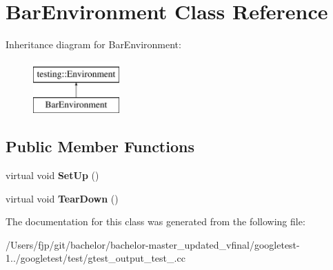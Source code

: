\hypertarget{class_bar_environment}{}\section{Bar\+Environment Class Reference}
\label{class_bar_environment}
Inheritance diagram for Bar\+Environment\+:\begin{figure}[H]
\begin{center}
\leavevmode
\includegraphics[height=2.000000cm]{class_bar_environment}
\end{center}
\end{figure}
\subsection*{Public Member Functions}
\begin{DoxyCompactItemize}
\item 
\mbox{\label{class_bar_environment_a88e17c5dd1dcea7a4538f2f3c6bf7bdd}} 
virtual void {\bfseries Set\+Up} ()
\item 
\mbox{\label{class_bar_environment_a384f951da72a2a18bb0c2b3506376b09}} 
virtual void {\bfseries Tear\+Down} ()
\end{DoxyCompactItemize}


The documentation for this class was generated from the following file\+:\begin{DoxyCompactItemize}
\item 
/\+Users/fjp/git/bachelor/bachelor-\/master\+\_\+updated\+\_\+vfinal/googletest-\/1../googletest/test/gtest\+\_\+output\+\_\+test\+\_\+.\+cc\end{DoxyCompactItemize}
